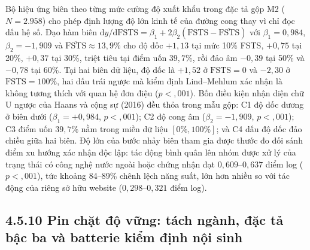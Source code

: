 \documentclass[
  a4paper,
  13pt]{extreport}
\begin{document}
Bộ hiệu ứng biên theo từng mức cường độ xuất khẩu trong đặc tả gộp M2
(\(N = 2.958\)) cho phép định lượng độ lớn kinh tế của đường cong thay
vì chỉ đọc dấu hệ số. Đạo hàm biên
\(\mathrm{d}y/\mathrm{d}\mathrm{FSTS} = \beta_1 + 2\beta_2(\mathrm{FSTS} - \overline{\mathrm{FSTS}})\)
với \(\beta_1 = 0{,}984\), \(\beta_2 = -1{,}909\) và
\(\overline{\mathrm{FSTS}} \approx 13{,}9\%\) cho độ dốc \(+1{,}13\) tại
mức 10\% FSTS, \(+0{,}75\) tại 20\%, \(+0{,}37\) tại 30\%, triệt tiêu
tại điểm uốn \(39{,}7\%\), rồi đảo âm \(-0{,}39\) tại 50\% và
\(-0{,}78\) tại 60\%. Tại hai biên dữ liệu, độ dốc là \(+1{,}52\) ở
\(\mathrm{FSTS} = 0\) và \(-2{,}30\) ở \(\mathrm{FSTS} = 100\%\), hai
dấu trái ngược mà kiểm định Lind--Mehlum xác nhận là không tương thích
với quan hệ đơn điệu (\(p < {,}001\)). Bốn điều kiện nhận diện chữ U
ngược của Haans và cộng sự (2016) đều thỏa trong mẫu gộp: C1 độ dốc
dương ở biên dưới (\(\beta_1 = +0{,}984\), \(p < {,}001\)); C2 độ cong
âm (\(\beta_2 = -1{,}909\), \(p < {,}001\)); C3 điểm uốn \(39{,}7\%\)
nằm trong miền dữ liệu \([0\%, 100\%]\); và C4 dấu độ dốc đảo chiều giữa
hai biên. Độ lớn của bước nhảy biên tham gia được thước đo đối sánh điểm
xu hướng xác nhận độc lập: tác động bình quân lên nhóm được xử lý của
trạng thái có công nghệ nước ngoài hoặc chứng nhận đạt
\(0{,}609\)--\(0{,}637\) điểm log (\(p < {,}001\)), tức khoảng 84--89\%
chênh lệch năng suất, lớn hơn nhiều so với tác động của riêng sở hữu
website (\(0{,}298\)--\(0{,}321\) điểm log).

\hypertarget{pin-chux1eb7t-ux111ux1ed9-vux1eefng-tuxe1ch-nguxe0nh-ux111ux1eb7c-tux1ea3-bux1eadc-ba-vuxe0-batterie-kiux1ec3m-ux111ux1ecbnh-nux1ed9i-sinh}{%
\subsection{4.5.10 Pin chặt độ vững: tách ngành, đặc tả bậc ba và
batterie kiểm định nội
sinh}\label{pin-chux1eb7t-ux111ux1ed9-vux1eefng-tuxe1ch-nguxe0nh-ux111ux1eb7c-tux1ea3-bux1eadc-ba-vuxe0-batterie-kiux1ec3m-ux111ux1ecbnh-nux1ed9i-sinh}}
\end{document}

